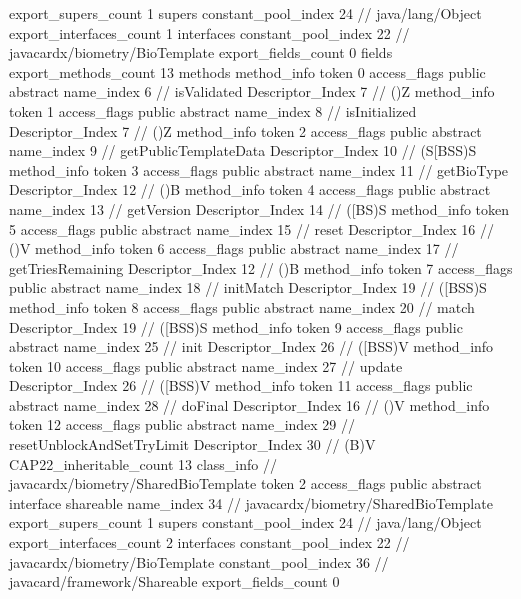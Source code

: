{{{			export_supers_count	1
			supers {
				constant_pool_index	24		// java/lang/Object
			}
			export_interfaces_count	1
			interfaces {
				constant_pool_index	22		// javacardx/biometry/BioTemplate
			}
			export_fields_count	0
			fields {
			}
			export_methods_count	13
			methods {
				method_info {
					token	0
					access_flags	public abstract
					name_index	6		// isValidated
					Descriptor_Index	7		// ()Z
				}
				method_info {
					token	1
					access_flags	public abstract
					name_index	8		// isInitialized
					Descriptor_Index	7		// ()Z
				}
				method_info {
					token	2
					access_flags	public abstract
					name_index	9		// getPublicTemplateData
					Descriptor_Index	10		// (S[BSS)S
				}
				method_info {
					token	3
					access_flags	public abstract
					name_index	11		// getBioType
					Descriptor_Index	12		// ()B
				}
				method_info {
					token	4
					access_flags	public abstract
					name_index	13		// getVersion
					Descriptor_Index	14		// ([BS)S
				}
				method_info {
					token	5
					access_flags	public abstract
					name_index	15		// reset
					Descriptor_Index	16		// ()V
				}
				method_info {
					token	6
					access_flags	public abstract
					name_index	17		// getTriesRemaining
					Descriptor_Index	12		// ()B
				}
				method_info {
					token	7
					access_flags	public abstract
					name_index	18		// initMatch
					Descriptor_Index	19		// ([BSS)S
				}
				method_info {
					token	8
					access_flags	public abstract
					name_index	20		// match
					Descriptor_Index	19		// ([BSS)S
				}
				method_info {
					token	9
					access_flags	public abstract
					name_index	25		// init
					Descriptor_Index	26		// ([BSS)V
				}
				method_info {
					token	10
					access_flags	public abstract
					name_index	27		// update
					Descriptor_Index	26		// ([BSS)V
				}
				method_info {
					token	11
					access_flags	public abstract
					name_index	28		// doFinal
					Descriptor_Index	16		// ()V
				}
				method_info {
					token	12
					access_flags	public abstract
					name_index	29		// resetUnblockAndSetTryLimit
					Descriptor_Index	30		// (B)V
				}
			}
			CAP22_inheritable_count	13
		}
		class_info {		// javacardx/biometry/SharedBioTemplate
			token	2
			access_flags	public abstract interface shareable
			name_index	34		// javacardx/biometry/SharedBioTemplate
			export_supers_count	1
			supers {
				constant_pool_index	24		// java/lang/Object
			}
			export_interfaces_count	2
			interfaces {
				constant_pool_index	22		// javacardx/biometry/BioTemplate
				constant_pool_index	36		// javacard/framework/Shareable
			}
			export_fields_count	0
}}}

